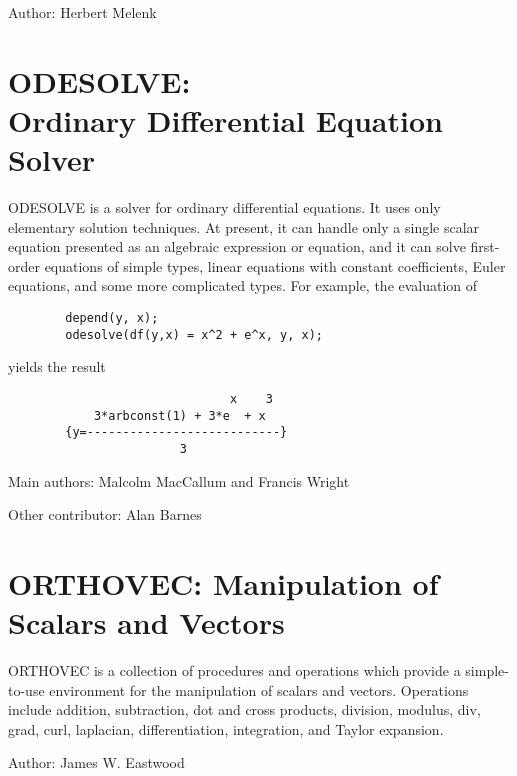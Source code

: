Author: Herbert Melenk


\fi

\newpage

\section[ODESOLVE: Ordinary Differential Equation Solver]%
        {ODESOLVE: \protect\\ Ordinary Differential Equation Solver}


ODESOLVE is a solver for ordinary differential equations.  It uses
only elementary solution techniques.  At present, it can handle only a
single scalar equation presented as an algebraic expression or
equation, and it can solve first-order equations of simple types,
linear equations with constant coefficients, Euler equations, and some
more complicated types.  For example, the evaluation of
\begin{verbatim}
        depend(y, x);
        odesolve(df(y,x) = x^2 + e^x, y, x);
\end{verbatim}
yields the result
\begin{verbatim}
                               x    3
            3*arbconst(1) + 3*e  + x
        {y=---------------------------}
                        3
\end{verbatim}

Main authors: Malcolm MacCallum and Francis Wright

Other contributor: Alan Barnes



\newpage


\section{ORTHOVEC: Manipulation of Scalars and Vectors}


ORTHOVEC is a collection of \REDUCE procedures and operations which
provide a simple-to-use environment for the manipulation of scalars and
vectors.  Operations include addition, subtraction, dot and cross
products, division, modulus, div, grad, curl, laplacian, differentiation,
integration, and Taylor expansion.

Author: James W. Eastwood



\newpage


